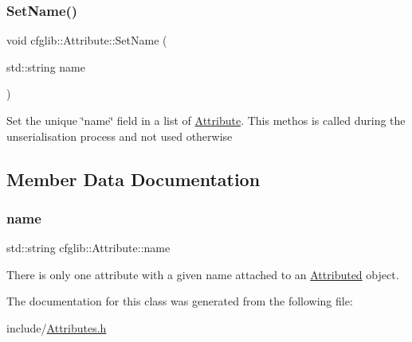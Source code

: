 \subsubsection{\texorpdfstring{Set\+Name()}{SetName()}}
{\footnotesize\ttfamily void cfglib\+::\+Attribute\+::\+Set\+Name (\begin{DoxyParamCaption}\item[{std\+::string}]{name }\end{DoxyParamCaption})\hspace{0.3cm}{\ttfamily [inline]}}

Set the unique \char`\"{}name\char`\"{} field in a list of \hyperlink{classcfglib_1_1Attribute}{Attribute}. This methos is called during the unserialisation process and not used otherwise 

\subsection{Member Data Documentation}
\mbox{\label{classcfglib_1_1Attribute_a9abcd440f01bbbc57fc64f274033cd22}} 
\subsubsection{\texorpdfstring{name}{name}}
{\footnotesize\ttfamily std\+::string cfglib\+::\+Attribute\+::name\hspace{0.3cm}{\ttfamily [protected]}}

There is only one attribute with a given name attached to an \hyperlink{classcfglib_1_1Attributed}{Attributed} object. 

The documentation for this class was generated from the following file\+:\begin{DoxyCompactItemize}
\item 
include/\hyperlink{Attributes_8h}{Attributes.\+h}\end{DoxyCompactItemize}
